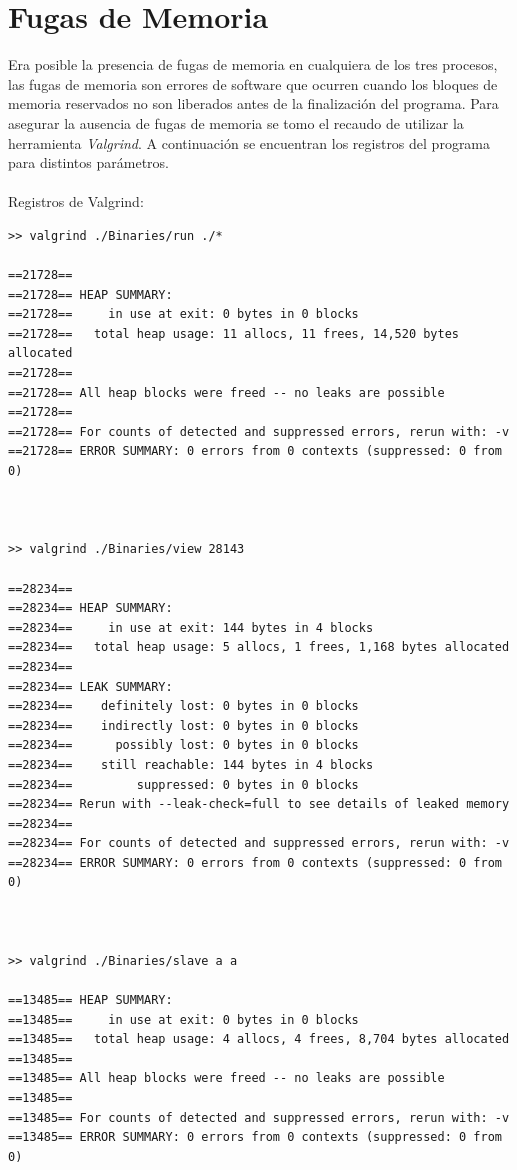 \documentclass[10pt,a4paper]{report}
\begin{document}
\section{Fugas de Memoria}
Era posible la presencia de fugas de memoria en cualquiera de los tres procesos, las fugas de memoria
son errores de software que ocurren cuando los bloques de memoria reservados no son liberados antes de la finalización del programa.
Para asegurar la ausencia de fugas de memoria se tomo el recaudo de utilizar la herramienta \textit{Valgrind}. A continuación se encuentran
los registros del programa para distintos parámetros.
\\\\ Registros de Valgrind:
\begin{lstlisting}
>> valgrind ./Binaries/run ./*

==21728== 
==21728== HEAP SUMMARY:
==21728==     in use at exit: 0 bytes in 0 blocks
==21728==   total heap usage: 11 allocs, 11 frees, 14,520 bytes allocated
==21728== 
==21728== All heap blocks were freed -- no leaks are possible
==21728== 
==21728== For counts of detected and suppressed errors, rerun with: -v
==21728== ERROR SUMMARY: 0 errors from 0 contexts (suppressed: 0 from 0)



>> valgrind ./Binaries/view 28143

==28234== 
==28234== HEAP SUMMARY:
==28234==     in use at exit: 144 bytes in 4 blocks
==28234==   total heap usage: 5 allocs, 1 frees, 1,168 bytes allocated
==28234== 
==28234== LEAK SUMMARY:
==28234==    definitely lost: 0 bytes in 0 blocks
==28234==    indirectly lost: 0 bytes in 0 blocks
==28234==      possibly lost: 0 bytes in 0 blocks
==28234==    still reachable: 144 bytes in 4 blocks
==28234==         suppressed: 0 bytes in 0 blocks
==28234== Rerun with --leak-check=full to see details of leaked memory
==28234== 
==28234== For counts of detected and suppressed errors, rerun with: -v
==28234== ERROR SUMMARY: 0 errors from 0 contexts (suppressed: 0 from 0)



>> valgrind ./Binaries/slave a a

==13485== HEAP SUMMARY:
==13485==     in use at exit: 0 bytes in 0 blocks
==13485==   total heap usage: 4 allocs, 4 frees, 8,704 bytes allocated
==13485== 
==13485== All heap blocks were freed -- no leaks are possible
==13485== 
==13485== For counts of detected and suppressed errors, rerun with: -v
==13485== ERROR SUMMARY: 0 errors from 0 contexts (suppressed: 0 from 0)
\end{lstlisting}
\end{document}
